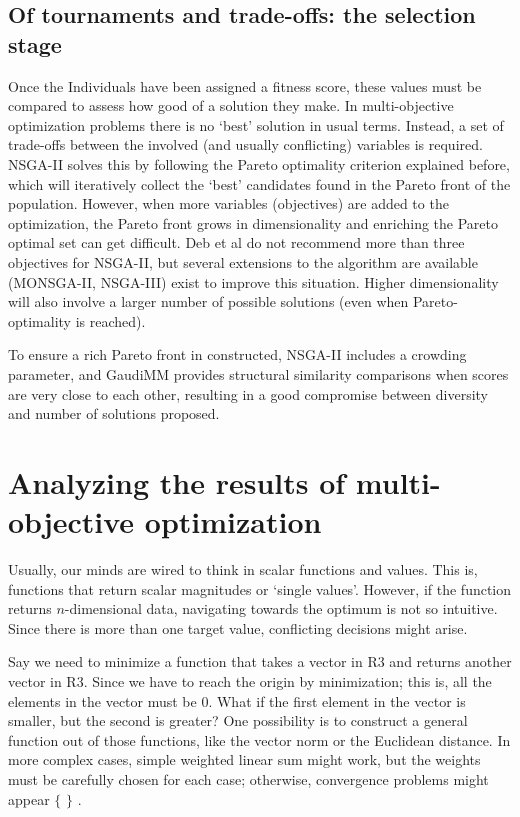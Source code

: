 \subsection{Of tournaments and trade-offs: the selection stage}
Once the Individuals have been assigned a fitness score, these values must be compared to assess how good of a solution they make. In multi-objective optimization problems there is no ‘best’ solution in usual terms. Instead, a set of trade-offs between the involved (and usually conflicting) variables is required. NSGA-II solves this by following the Pareto optimality criterion explained before, which will iteratively collect the ‘best’ candidates found in the Pareto front of the population. However, when more variables (objectives) are added to the optimization, the Pareto front grows in dimensionality and enriching the Pareto optimal set can get difficult. Deb et al do not recommend more than three objectives for NSGA-II, but several extensions to the algorithm are available (MONSGA-II, NSGA-III) exist to improve this situation. Higher dimensionality will also involve a larger number of possible solutions (even when Pareto-optimality is reached).

To ensure a rich Pareto front in constructed, NSGA-II includes a crowding parameter, and GaudiMM provides structural similarity comparisons when scores are very close to each other, resulting in a good compromise between diversity and number of solutions proposed.

\section{Analyzing the results of multi-objective optimization}


Usually, our minds are wired to think in scalar functions and values. This is, functions that return scalar magnitudes or ‘single values’. However, if the function returns $n$-dimensional data, navigating towards the optimum is not so intuitive. Since there is more than one target value, conflicting decisions might arise.

Say we need to minimize a function that takes a vector in R3 and returns another vector in R3. Since we have to reach the origin by minimization; this is, all the elements in the vector must be 0. What if the first element in the vector is smaller, but the second is greater? One possibility is to construct a general function out of those functions, like the vector norm or the Euclidean distance. In more complex cases, simple weighted linear sum might work, but the weights must be carefully chosen for each case; otherwise, convergence problems might appear $ \{ $ $ \} $ .

